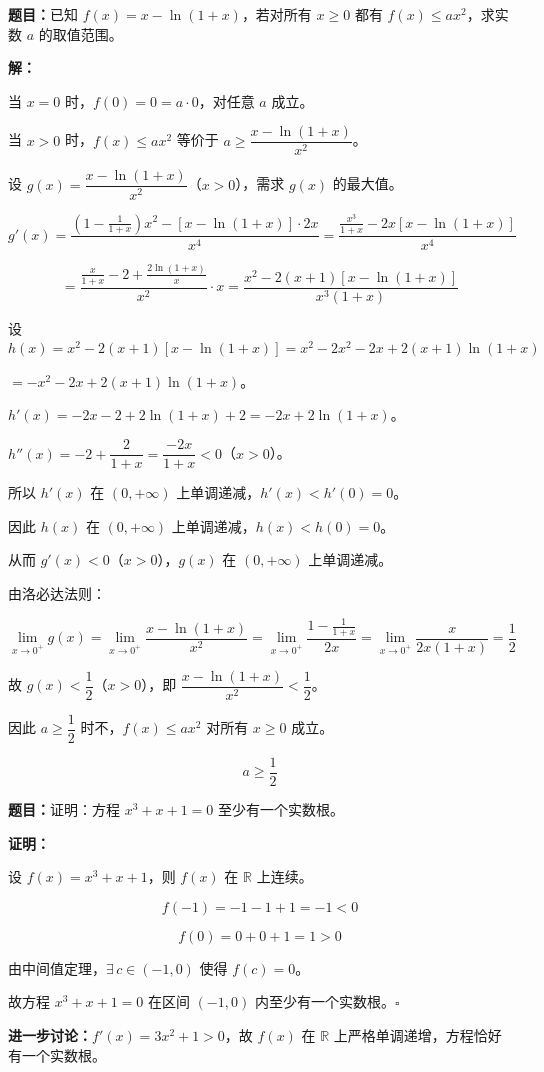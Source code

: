 \documentclass[12pt, a4paper]{ctexart}
\begin{document}
\begin{examplebox}[【例题8】构造函数证明带参数不等式]
\textbf{题目：}已知 $f(x) = x - \ln(1+x)$，若对所有 $x \geq 0$ 都有 $f(x) \leq ax^2$，求实数 $a$ 的取值范围。

\medskip
\textbf{解：}

当 $x = 0$ 时，$f(0) = 0 = a \cdot 0$，对任意 $a$ 成立。

当 $x > 0$ 时，$f(x) \leq ax^2$ 等价于 $a \geq \dfrac{x - \ln(1+x)}{x^2}$。

设 $g(x) = \dfrac{x - \ln(1+x)}{x^2}$（$x > 0$），需求 $g(x)$ 的最大值。

$$g'(x) = \frac{\left(1 - \frac{1}{1+x}\right) x^2 - [x - \ln(1+x)] \cdot 2x}{x^4} = \frac{\frac{x^3}{1+x} - 2x[x - \ln(1+x)]}{x^4}$$

$$= \frac{\frac{x}{1+x} - 2 + \frac{2\ln(1+x)}{x}}{x^2} \cdot x = \frac{x^2 - 2(x+1)[x - \ln(1+x)]}{x^3(1+x)}$$

设 $h(x) = x^2 - 2(x+1)[x - \ln(1+x)] = x^2 - 2x^2 - 2x + 2(x+1)\ln(1+x)$

$= -x^2 - 2x + 2(x+1)\ln(1+x)$。

$h'(x) = -2x - 2 + 2\ln(1+x) + 2 = -2x + 2\ln(1+x)$。

$h''(x) = -2 + \dfrac{2}{1+x} = \dfrac{-2x}{1+x} < 0$（$x > 0$）。

所以 $h'(x)$ 在 $(0, +\infty)$ 上单调递减，$h'(x) < h'(0) = 0$。

因此 $h(x)$ 在 $(0, +\infty)$ 上单调递减，$h(x) < h(0) = 0$。

从而 $g'(x) < 0$（$x > 0$），$g(x)$ 在 $(0, +\infty)$ 上单调递减。

由洛必达法则：

$$\lim_{x \to 0^+} g(x) = \lim_{x \to 0^+} \frac{x - \ln(1+x)}{x^2} = \lim_{x \to 0^+} \frac{1 - \frac{1}{1+x}}{2x} = \lim_{x \to 0^+} \frac{x}{2x(1+x)} = \frac{1}{2}$$

故 $g(x) < \dfrac{1}{2}$（$x > 0$），即 $\dfrac{x - \ln(1+x)}{x^2} < \dfrac{1}{2}$。

因此 $a \geq \dfrac{1}{2}$ 时不，$f(x) \leq ax^2$ 对所有 $x \geq 0$ 成立。

$$\boxed{a \geq \frac{1}{2}}$$
\end{examplebox}

\begin{examplebox}[【例题9】反证法证明存在性]
\textbf{题目：}证明：方程 $x^3 + x + 1 = 0$ 至少有一个实数根。

\medskip
\textbf{证明：}

设 $f(x) = x^3 + x + 1$，则 $f(x)$ 在 $\mathbb{R}$ 上连续。

$$f(-1) = -1 - 1 + 1 = -1 < 0$$

$$f(0) = 0 + 0 + 1 = 1 > 0$$

由中间值定理，$\exists\, c \in (-1, 0)$ 使得 $f(c) = 0$。

故方程 $x^3 + x + 1 = 0$ 在区间 $(-1, 0)$ 内至少有一个实数根。\hfill$\square$

\medskip
\textbf{进一步讨论：}$f'(x) = 3x^2 + 1 > 0$，故 $f(x)$ 在 $\mathbb{R}$ 上严格单调递增，方程恰好有一个实数根。
\end{examplebox}
\end{document}
